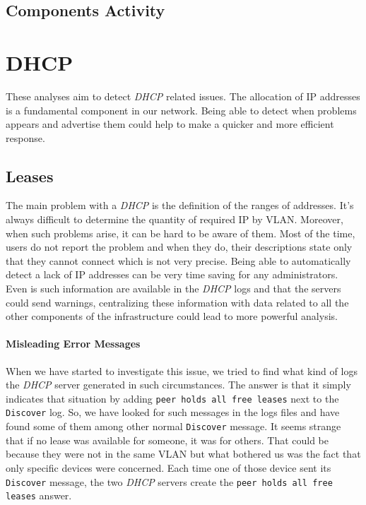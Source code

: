 \subsection{Components Activity}


\section{DHCP}
These analyses aim to detect \emph{DHCP} related issues. The allocation  of IP addresses is a fundamental component in our network. Being able to detect when problems appears and advertise them could help to make a quicker and more efficient response.

\subsection{Leases}
The main problem with a \emph{DHCP} is the definition of the ranges of addresses. It's always difficult to determine the quantity of required IP by VLAN. Moreover, when such problems arise, it can be hard to be aware of them. Most of the time, users do not report the problem and when they do, their descriptions state only that they cannot connect which is not very precise. Being able to automatically detect a lack of IP addresses can be very time saving for any administrators. Even is such information are available in the \emph{DHCP} logs and that the servers could send warnings, centralizing these information with data related to all the other components of the infrastructure could lead to more powerful analysis. 

\paragraph*{Misleading Error Messages} When we have started to investigate this issue, we tried to find what kind of logs the \emph{DHCP} server generated in such circumstances. The answer is that it simply indicates that situation by adding \texttt{peer holds all free leases} next to the \texttt{Discover} log. So, we have looked for such messages in the logs files and have found some of them among other normal \texttt{Discover} message. It seems strange that if no lease was available for someone, it was for others. That could be because they were not in the same VLAN but what bothered us was the fact that only specific devices were concerned. Each time one of those device sent its \texttt{Discover} message, the two \emph{DHCP} servers create the \texttt{peer holds all free leases} answer. 

